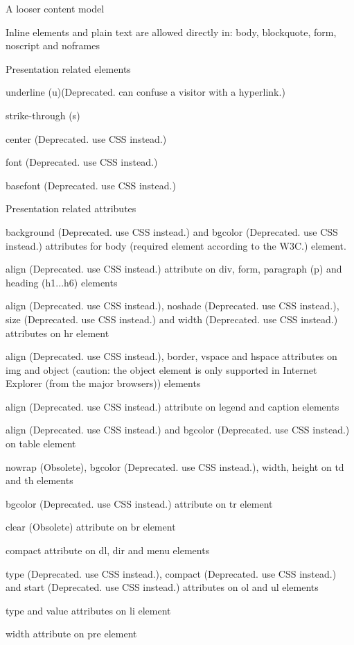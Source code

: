 \begin{compactitem}

\item A looser content model

	\begin{compactitem}
	\item Inline elements and plain text are allowed directly in: body, blockquote, form, noscript and noframes
	\end{compactitem}

\item Presentation related elements
	
	\begin{compactitem}
	\item underline (u)(Deprecated. can confuse a visitor with a hyperlink.)
	\item strike-through (s)
	\item center (Deprecated. use CSS instead.)
	\item font (Deprecated. use CSS instead.)
	\item basefont (Deprecated. use CSS instead.)
	\end{compactitem}
	
\item Presentation related attributes
	\begin{compactitem}
	\item background (Deprecated. use CSS instead.) and bgcolor (Deprecated. use CSS instead.)  attributes for body (required element according to the W3C.) element.
	\item align (Deprecated. use CSS instead.) attribute on div, form, paragraph (p) and heading (h1...h6) elements
	\item align (Deprecated. use CSS instead.), noshade (Deprecated. use CSS instead.), size (Deprecated. use CSS instead.) and width (Deprecated. use CSS instead.) attributes on hr element
	\item align (Deprecated. use CSS instead.), border, vspace and hspace attributes on img and object (caution: the object element is only supported in Internet Explorer (from the major browsers)) elements
	\item align (Deprecated. use CSS instead.) attribute on legend and caption elements
	\item align (Deprecated. use CSS instead.) and bgcolor (Deprecated. use CSS instead.) on table element
	\item nowrap (Obsolete), bgcolor (Deprecated. use CSS instead.), width, height on td and th elements
	\item bgcolor (Deprecated. use CSS instead.) attribute on tr element
	\item clear (Obsolete) attribute on br element
	\item compact attribute on dl, dir and menu elements
	\item type (Deprecated. use CSS instead.), compact (Deprecated. use CSS instead.) and start (Deprecated. use CSS instead.) attributes on ol and ul elements
	\item type and value attributes on li element
	\item width attribute on pre element
	\end{compactitem}
	

\end{compactitem}
